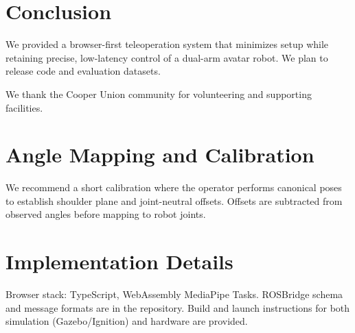 \documentclass[sigconf]{acmart}
\begin{document}
\section{Conclusion}
We provided a browser-first teleoperation system that minimizes setup while retaining precise, low-latency control of a dual-arm avatar robot. We plan to release code and evaluation datasets.

\begin{acks}
We thank the Cooper Union community for volunteering and supporting facilities.
\end{acks}



\appendix
\section{Angle Mapping and Calibration}
We recommend a short calibration where the operator performs canonical poses to establish shoulder plane and joint-neutral offsets. Offsets are subtracted from observed angles before mapping to robot joints.

\section{Implementation Details}
Browser stack: TypeScript, WebAssembly MediaPipe Tasks. ROSBridge schema and message formats are in the repository. Build and launch instructions for both simulation (Gazebo/Ignition) and hardware are provided.
\end{document}
